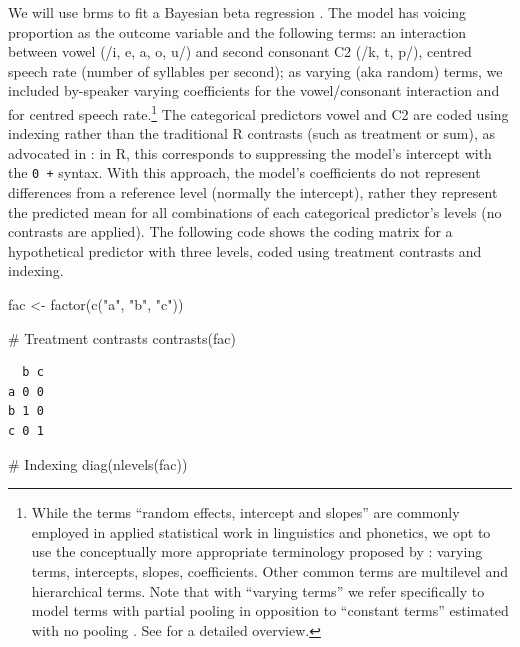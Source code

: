\documentclass[
  authoryear,
  preprint,
  3p]{elsarticle}
\newenvironment{Shaded}{\begin{snugshade}}{\end{snugshade}}
\newcommand{\CommentTok}[1]{\textcolor[rgb]{0.37,0.37,0.37}{#1}}
\newcommand{\FunctionTok}[1]{\textcolor[rgb]{0.28,0.35,0.67}{#1}}
\newcommand{\NormalTok}[1]{\textcolor[rgb]{0.00,0.23,0.31}{#1}}
\newcommand{\OtherTok}[1]{\textcolor[rgb]{0.00,0.23,0.31}{#1}}
\newcommand{\StringTok}[1]{\textcolor[rgb]{0.13,0.47,0.30}{#1}}
\begin{document}
We will use brms to fit a Bayesian beta regression \citep{burkner2017}.
The model has voicing proportion as the outcome variable and the
following terms: an interaction between vowel (/i, e, a, o, u/) and
second consonant C2 (/k, t, p/), centred speech rate (number of
syllables per second); as varying (aka random) terms, we included
by-speaker varying coefficients for the vowel/consonant interaction and
for centred speech rate.\footnote{While the terms ``random effects,
  intercept and slopes'' are commonly employed in applied statistical
  work in linguistics and phonetics, we opt to use the conceptually more
  appropriate terminology proposed by \citet{gelman2005}: varying terms,
  intercepts, slopes, coefficients. Other common terms are multilevel
  and hierarchical terms. Note that with ``varying terms'' we refer
  specifically to model terms with partial pooling in opposition to
  ``constant terms'' estimated with no pooling
  \citep[p.~408]{mcelreath2020}. See \citet{nalborczyk2019} for a
  detailed overview.} The categorical predictors vowel and C2 are coded
using indexing rather than the traditional R contrasts (such as
treatment or sum), as advocated in \citet[p 155, Ch 8]{mcelreath2019}:
in R, this corresponds to suppressing the model's intercept with the
\texttt{0\ +} syntax. \textcolor[HTML]{b22222}{With this approach, the
model's coefficients do not represent differences from a reference level
(normally the intercept), rather they represent the predicted mean for
all combinations of each categorical predictor's levels (no contrasts
are applied). The following code shows the coding matrix for a
hypothetical predictor with three levels, coded using treatment
contrasts and indexing.}

\begin{Shaded}
\begin{Highlighting}[]
\NormalTok{fac }\OtherTok{\textless{}{-}} \FunctionTok{factor}\NormalTok{(}\FunctionTok{c}\NormalTok{(}\StringTok{"a"}\NormalTok{, }\StringTok{"b"}\NormalTok{, }\StringTok{"c"}\NormalTok{))}

\CommentTok{\# Treatment contrasts}
\FunctionTok{contrasts}\NormalTok{(fac)}
\end{Highlighting}
\end{Shaded}

\begin{verbatim}
  b c
a 0 0
b 1 0
c 0 1
\end{verbatim}

\begin{Shaded}
\begin{Highlighting}[]
\CommentTok{\# Indexing}
\FunctionTok{diag}\NormalTok{(}\FunctionTok{nlevels}\NormalTok{(fac))}
\end{Highlighting}
\end{Shaded}
\end{document}
